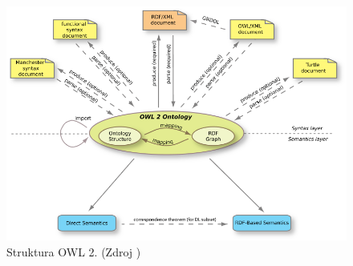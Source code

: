 \begin{figure}[h]
\begin{center}
\includegraphics[width=15cm]{figures/OWL2-structure}
\caption{Struktura OWL 2. (Zdroj \cite{owl2})}
\label{img:owl2}
\end{center}
\end{figure}

